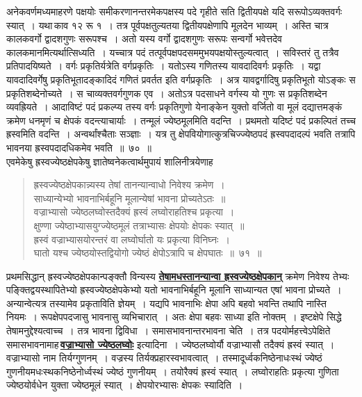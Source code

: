 \documentclass[11pt, openany]{book}
\begin{document}
{{ अनेकवर्णमध्यमाहरणे पक्षयोः समीकरणानन्तरमेकपक्षस्य पदे गृहीते सति 
द्वितीयपक्षे यदि सरूपोऽव्यक्तवर्गः स्यात्~। यथा\textendash \,काव १२ रू १~। तत्र
पूर्वपक्षतुल्यतया द्वितीयपक्षेणापि मूलदेन भाव्यम्~। अस्ति चात्र कालकवर्गो
द्वादशगुणः 
सरूपश्च~। अतो यस्य वर्गो द्वादशगुणः सरूपः सन्वर्गो भवेत्तदेव
कालकमानमित्यर्थात्सिध्यति~। यच्चात्र पदं तत्पूर्वपक्षपदसममुभयपक्षयोस्तुल्यत्वात्~।
सविस्तरं तु 
तत्रैव प्रतिपादयिष्यते~। वर्गः प्रकृतिर्यत्रेति वर्गप्रकृतिः~। यतोऽस्य
गणितस्य 
यावदादिवर्गः प्रकृतिः~। यद्वा यावदादिवर्गेषु प्रकृतिभूतादङ्कादिदं गणितं
प्रवर्तत 
इति वर्गप्रकृतिः~। अत्र यावद्वर्गादिषु प्रकृतिभूतो योऽङ्कः स
प्रकृतिशब्देनोच्यते~। 
स चाव्यक्तवर्गगुणक एव~। अतोऽत्र पदसाधने वर्गस्य यो गुणः स प्रकृतिशब्देन
व्यवह्रियते~। आदाविष्टं पदं प्रकल्प्य तस्य वर्गः प्रकृतिगुणो येनाङ्केन
युक्तो 
वर्जितो वा मूलं दद्यात्तमङ्कं क्रमेण धनमृणं च क्षेपकं वदन्त्याचार्याः~।
तन्मूलं 
ज्येष्ठमूलमिति वदन्ति~। प्रथमतो यदिष्टं पदं प्रकल्पितं तच्च ह्रस्वमिति
वदन्ति~। 
अन्वर्थांश्चैताः सञ्ज्ञाः~। यत्र तु क्षेपवियोगात्कुत्रचिज्ज्येष्ठपदं
ह्रस्वपदादल्पं भवति 
तत्रापि भावनया ह्रस्वपदादधिकमेव भवति~॥~७०~॥~\\

\vspace{-4mm}
 एवमेकेषु ह्रस्वज्येष्ठक्षेपकेषु ज्ञातेष्वनेकत्वार्थमुपायं शालिनीत्रयेणाह\textendash 
\newpage
\fancyhead[LE,RO]{\thepage}
\cfoot{}

 \label{71}
 \begin{quote}
     \ab 
      ह्रस्वज्येष्ठक्षेपकान्न्यस्य तेषां तानन्यान्वाधो निवेश्य क्रमेण~।\\
 साध्यान्येभ्यो भावनाभिर्बहूनि मूलान्येषां भावना प्रोच्यतेऽतः~॥~\\
 वज्राभ्यासो ज्येष्ठलघ्वोस्तदैक्यं ह्रस्वं लघ्वोराहतिश्च प्रकृत्या~। \\
 क्षुण्णा ज्येष्ठाभ्यासयुग्ज्येष्ठमूलं तत्राभ्यासः क्षेपयोः क्षेपकः स्यात्~॥~\\
 ह्रस्वं वज्राभ्यासयोरन्तरं वा लघ्वोर्घातो यः प्रकृत्या विनिघ्नः~। \\
 घातो यश्च ज्येष्ठयोस्तद्वियोगो ज्येष्ठं क्षेपोऽत्रापि च क्षेपघातः~॥~७१~॥~
 \end{quote}

प्रथमसिद्धान् ह्रस्वज्येष्ठक्षेपकान्पङ्क्तौ विन्यस्य \hyperref[71]{\textbf{तेषामधस्तानन्यान्वा ह्रस्वज्येष्ठक्षेपकान्}} क्रमेण निवेश्य तेभ्यः पङ्क्तिद्वयस्थापितेभ्यो ह्रस्वज्येष्ठक्षेपकेभ्यो यतो भावनाभिर्बहूनि मूलानि साध्यान्यत एषां भावना प्रोच्यते~। अन्यान्वेत्यत्र तस्यामेव प्रकृताविति ज्ञेयम्~। यद्यपि भावनाभिः क्षेपा अपि बहवो भवन्ति तथापि नास्ति नियमः~। रूपक्षेपपदजासु भावनासु व्यभिचारात्~। अतः क्षेपा बहवः साध्या इति नोक्तम्~। इष्टक्षेपे सिद्धे तेषामनुद्देश्यत्वाच्च~। तत्र भावना द्विविधा~। समासभावनान्तरभावना चेति~। तत्र पदयोर्महत्त्वेऽपेक्षिते समासभावनामाह\textendash \,\hyperref[71]{\textbf{वज्राभ्यासो ज्येष्ठलघ्वोः}} इत्यादिना~। ज्येष्ठलघ्वोर्यौ वज्राभ्यासौ तदैक्यं ह्रस्वं
स्यात्~। वज्राभ्यासो नाम तिर्यग्गुणनम्~। वज्रस्य तिर्यक्प्रहारस्वभावत्वात्~।
तस्मादूर्ध्वकनिष्ठेनाधःस्थं ज्येष्ठं गुणनीयमधःस्थकनिष्ठेनोर्ध्वस्थं ज्येष्ठं
गुणनीयम्~। तयोरैक्यं ह्रस्वं स्यात्~। लघ्वोराहतिः प्रकृत्या गुणिता ज्येष्ठयोर्वधेन युक्ता
ज्येष्ठमूलं स्यात्~। क्षेपयोरभ्यासः क्षेपकः स्यादिति~। \\

}}
\end{document}
